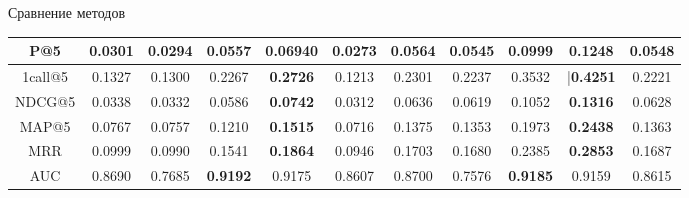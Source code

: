\documentclass[10pt,pdf,hyperref={unicode}]{beamer}
\begin{document}
\begin{frame}{Сравнение методов}
\begin{table}[H]
\begin{flushleft}
{\begin{minipage}{\textwidth}
\begin{tabular}{|c|c|c|c|c|c|c|c|c|c|c|}
\hline
P@5 & 0.0301 & 0.0294 &	0.0557 & \textbf{0.06940} &	0.0273 & 0.0564 & 0.0545 &	0.0999 & \textbf{0.1248} & 0.0548 \\
\hline
1call@5 & 0.1327 & 0.1300 &	0.2267 & \textbf{0.2726} & 0.1213 & 0.2301 & 0.2237 & 0.3532	 & |\textbf{0.4251} & 	0.2221\\
\hline
NDCG@5 & 0.0338 &	0.0332 & 0.0586 &  \textbf{0.0742} & 0.0312 & 0.0636 & 0.0619 &	0.1052 & \textbf{0.1316} &	0.0628 \\
\hline
MAP@5 &  0.0767 & 0.0757 & 0.1210 &	\textbf{0.1515} & 0.0716 &  0.1375 &	0.1353 & 0.1973	& \textbf{0.2438} & 0.1363 \\
\hline
MRR & 0.0999 & 0.0990 &	0.1541 & \textbf{0.1864} & 0.0946 & 0.1703 &	0.1680 & 0.2385 &  \textbf{0.2853} &	0.1687\\
\hline
AUC &0.8690 &  0.7685 &	\textbf{0.9192} & 0.9175 & 0.8607 &  0.8700 & 0.7576 & \textbf{0.9185} & 0.9159 &	0.8615\\
\hline
\end{tabular}
\end{minipage}}
\end{flushleft}
\end{table}

\end{frame}
\end{document}
